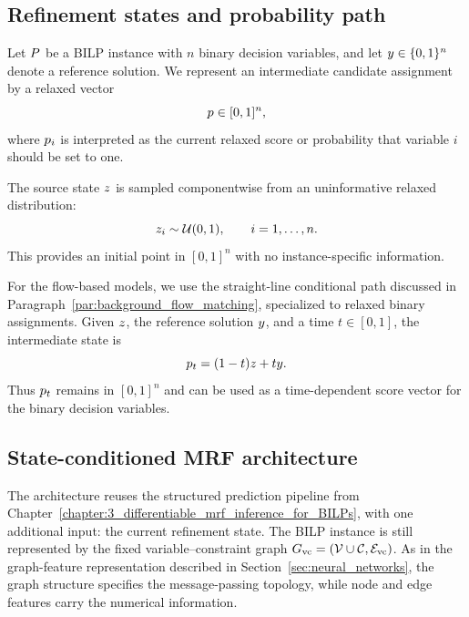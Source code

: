\subsection{Refinement states and probability path}

Let $P$ be a BILP instance with $n$ binary decision variables, and let $y\in\{0,1\}^n$ denote a reference solution. We represent an intermediate candidate assignment by a relaxed vector
\begin{equation*}
    p \in [0,1]^n,
\end{equation*}
where $p_i$ is interpreted as the current relaxed score or probability that variable $i$ should be set to one.

The source state $z$ is sampled componentwise from an uninformative relaxed distribution:
\begin{equation}
    z_i \sim \mathcal{U}(0,1),
    \qquad i=1,\ldots,n.
    \label{eq:flow_source_distribution}
\end{equation}
This provides an initial point in $[0,1]^n$ with no instance-specific information.

For the flow-based models, we use the straight-line conditional path discussed in Paragraph~\ref{par:background_flow_matching}, specialized to relaxed binary assignments. Given $z$, the reference solution $y$, and a time $t\in[0,1]$, the intermediate state is
\begin{equation}
    p_t = (1-t)z + t y .
    \label{eq:flow_probability_path}
\end{equation}
Thus $p_t$ remains in $[0,1]^n$ and can be used as a time-dependent score vector for the binary decision variables.

\subsection{State-conditioned MRF architecture}
\label{sec:state_conditioned_mrf_architecture}

The architecture reuses the structured prediction pipeline from Chapter~\ref{chapter:3_differentiable_mrf_inference_for_BILPs}, with one additional input: the current refinement state. The BILP instance is still represented by the fixed variable--constraint graph $G_{\mathrm{vc}}=(\mathcal{V} \cup \mathcal{C}, \mathcal{E}_{\mathrm{vc}})$. As in the graph-feature representation described in Section~\ref{sec:neural_networks}, the graph structure specifies the message-passing topology, while node and edge features carry the numerical information.

